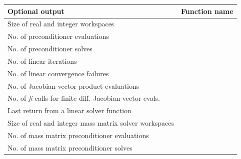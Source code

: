 \documentclass[letterpaper,10pt,english]{sphinxmanual}
\begin{document}
\begin{tabulary}{\linewidth}{|L|L|}
\hline
\textbf{\relax 
Optional output
} & \textbf{\relax 
Function name
}\\\hline

Size of real and integer workspaces
 & 
{\hyperref[c_interface/User_callable:ARKSpilsGetWorkSpace]{}}
\\\hline

No. of preconditioner evaluations
 & 
{\hyperref[c_interface/User_callable:ARKSpilsGetNumPrecEvals]{}}
\\\hline

No. of preconditioner solves
 & 
{\hyperref[c_interface/User_callable:ARKSpilsGetNumPrecSolves]{}}
\\\hline

No. of linear iterations
 & 
{\hyperref[c_interface/User_callable:ARKSpilsGetNumLinIters]{}}
\\\hline

No. of linear convergence failures
 & 
{\hyperref[c_interface/User_callable:ARKSpilsGetNumConvFails]{}}
\\\hline

No. of Jacobian-vector product evaluations
 & 
{\hyperref[c_interface/User_callable:ARKSpilsGetNumJtimesEvals]{}}
\\\hline

No. of \emph{fi} calls for finite diff. Jacobian-vector evals.
 & 
{\hyperref[c_interface/User_callable:ARKSpilsGetNumRhsEvals]{}}
\\\hline

Last return from a linear solver function
 & 
{\hyperref[c_interface/User_callable:ARKSpilsGetLastFlag]{}}
\\\hline

Size of real and integer mass matrix solver workspaces
 & 
{\hyperref[c_interface/User_callable:ARKSpilsGetMassWorkSpace]{}}
\\\hline

No. of mass matrix preconditioner evaluations
 & 
{\hyperref[c_interface/User_callable:ARKSpilsGetNumMassPrecEvals]{}}
\\\hline

No. of mass matrix preconditioner solves
 & 
{\hyperref[c_interface/User_callable:ARKSpilsGetNumMassPrecSolves]{}}
\\\hline


\end{tabulary}
\end{document}
